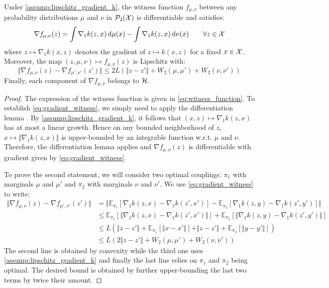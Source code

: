\begin{proposition}\label{prop:grad_witness_function}
Under \cref{assump:lipschitz_gradient_k}, the witness function $f_{\mu,\nu}$ between any probability distributions $\mu$ and $\nu$ in $\mathcal{P}_2({{\mathcal X}})$ is differentiable and satisfies:
\begin{equation}\label{eq:gradient_witness}
\nabla f_{\mu,\nu}(z) = \int \nabla_1 k(z,x)\mathop{}\!\mathrm{d} \mu(x) - \int \nabla_1 k(z,x)\mathop{}\!\mathrm{d} \nu(x) \qquad \forall z\in {{\mathcal X}}
\end{equation}
where $z \mapsto \nabla_1 k(x,z)$ denotes the gradient of $z\mapsto k(x,z)$ for a fixed $x \in {{\mathcal X}}$.
 Moreover, the map $(z,\mu,\nu)\mapsto f_{\mu,\nu}(z)$ is Lipschitz with:
\begin{equation}\label{eq:lipschitz_grad_witness}
\Vert \nabla f_{\mu,\nu}(z) - \nabla f_{\mu',\nu'}(z')\Vert \leq 2L (\Vert z-z' \Vert + W_2(\mu,\mu') + W_2(\nu,\nu')) 
\end{equation}
Finally, each component of $\nabla f_{\mu,\nu}$ belongs to ${{\mathcal H}}$.
\end{proposition}
\begin{proof}
	The expression of the witness function is given in \eqref{eq:witness_function}. To establish \eqref{eq:gradient_witness}, we simply need to apply the differentiation lemma \cite[Theorem 6.28]{Klenke:2008}. By \cref{assump:lipschitz_gradient_k}, it follows that $ (x,z)\mapsto \nabla_1 k(z,x)$ has at most a linear growth. Hence on any bounded neighborhood of $z$, $x\mapsto \Vert \nabla_1 k(z,x) \Vert $ is upper-bounded by an integrable function w.r.t. $\mu$ and $\nu$. Therefore, the differentiation lemma applies and  $\nabla f_{\mu,\nu}(z)$ is differentiable with gradient given by \cref{eq:gradient_witness}.
	
	To prove the second statement, we will consider two optimal couplings: $\pi_1$ with marginals $\mu$ and $\mu'$ and $\pi_2$ with marginals $\nu$ and $\nu'$.  We use \cref{eq:gradient_witness} to write:
	\begin{align*}
		\Vert \nabla f_{\mu,\nu}(z) - \nabla f_{\mu',\nu'}(z')\Vert 
		&= \Vert \mathbb{E}_{\pi_1}[ \nabla_1 k(z,x)-\nabla_1 k(z',x') ] - \mathbb{E}_{\pi_2}[\nabla_1 k(z,y)-\nabla_1 k(z',y')] \Vert\\
		& \leq
		\mathbb{E}_{\pi_1}[ \Vert  \nabla_1 k(z,x)-\nabla_1 k(z',x') \Vert ] + \mathbb{E}_{\pi_2}[\Vert  \nabla_1 k(z,y)-\nabla_1 k(z',y') \Vert ] \\
		&\leq
		L\left( \Vert  z-z' \Vert + \mathbb{E}_{\pi_1}[\Vert  x-x' \Vert]  +  \Vert  z-z' \Vert + \mathbb{E}_{\pi_2}[\Vert  y-y' \Vert ] \right)\\
		&\leq L(2\Vert z-z'\Vert + W_2(\mu,\mu')  + W_2(\nu,\nu') )
	\end{align*}
	The second line is obtained by convexity while the third one uses \cref{assump:lipschitz_gradient_k} and finally the last line relies on $\pi_1$ and $\pi_2$ being optimal. The desired bound is obtained by further upper-bounding the last two terms by twice their amount.
\end{proof}


